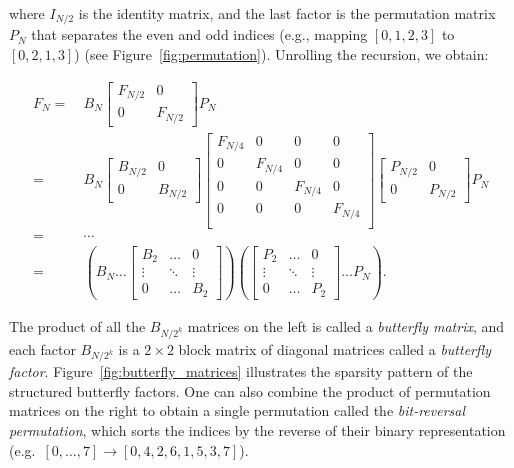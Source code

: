 where $I_{N/2}$ is the identity matrix, and the last factor is the permutation matrix $P_N$ that separates the even and odd indices (e.g., mapping $[0, 1, 2, 3]$ to $[0, 2, 1, 3]$) (see Figure~\ref{fig:permutation}).
Unrolling the recursion, we obtain:

\begin{equation}
  \label{eq:fft-factorization}
  \begin{aligned}
    F_N =&\ B_N \begin{bmatrix} F_{N/2} & 0 \\ 0 & F_{N/2} \end{bmatrix} P_N \\
    =&\ B_N \begin{bmatrix} B_{N/2} & 0 \\ 0 & B_{N/2} \end{bmatrix}
      \begin{bmatrix} F_{N/4} & 0 & 0 & 0 \\ 0 & F_{N/4} & 0 & 0 \\ 0 & 0 & F_{N/4} & 0 \\ 0 & 0 & 0 & F_{N/4} \\ \end{bmatrix}
     \begin{bmatrix} P_{N/2} & 0 \\ 0 & P_{N/2} \end{bmatrix} P_N \\
    =&\ \cdots \\
    =&\ \left( B_N \dots \begin{bmatrix} B_{2} & \dots & 0 \\ \vdots & \ddots & \vdots \\ 0 & \dots & B_2 \end{bmatrix} \right)
      \left( \begin{bmatrix} P_{2} & \dots & 0 \\ \vdots & \ddots & \vdots \\ 0 & \dots & P_2 \end{bmatrix} \dots P_N \right).
    \end{aligned}
  \end{equation}

The product of all the $B_{N/2^k}$ matrices on the left is called a \emph{butterfly
matrix}, and each factor $B_{N/2^k}$ is a $2\times2$ block matrix of diagonal matrices called a \emph{butterfly factor}.
Figure~\ref{fig:butterfly_matrices} illustrates the sparsity pattern of the structured butterfly factors. One can also combine the product of permutation matrices on the right to obtain a single permutation called the \emph{bit-reversal permutation}, which sorts the indices by the reverse of their binary representation (e.g.\ $[0, \dots, 7] \to [0, 4, 2, 6, 1, 5, 3, 7]$).

